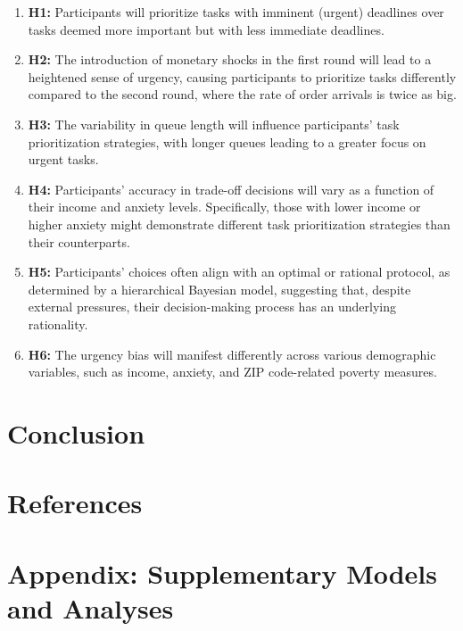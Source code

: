 \documentclass[
]{article}
\providecommand{\tightlist}{%
  \setlength{\itemsep}{0pt}\setlength{\parskip}{0pt}}\usepackage{longtable,booktabs,array}
\begin{document}
\begin{enumerate}
\def\labelenumi{\arabic{enumi}.}
\tightlist
\item
  \textbf{H1:} Participants will prioritize tasks with imminent (urgent)
  deadlines over tasks deemed more important but with less immediate
  deadlines.
\item
  \textbf{H2:} The introduction of monetary shocks in the first round
  will lead to a heightened sense of urgency, causing participants to
  prioritize tasks differently compared to the second round, where the
  rate of order arrivals is twice as big.
\item
  \textbf{H3:} The variability in queue length will influence
  participants' task prioritization strategies, with longer queues
  leading to a greater focus on urgent tasks.
\item
  \textbf{H4:} Participants' accuracy in trade-off decisions will vary
  as a function of their income and anxiety levels. Specifically, those
  with lower income or higher anxiety might demonstrate different task
  prioritization strategies than their counterparts.
\item
  \textbf{H5:} Participants' choices often align with an optimal or
  rational protocol, as determined by a hierarchical Bayesian model,
  suggesting that, despite external pressures, their decision-making
  process has an underlying rationality.
\item
  \textbf{H6:} The urgency bias will manifest differently across various
  demographic variables, such as income, anxiety, and ZIP code-related
  poverty measures.
\end{enumerate}

\hypertarget{conclusion}{%
\section{Conclusion}\label{conclusion}}

\hypertarget{references}{%
\section{References}\label{references}}

\hypertarget{appendix-supplementary-models-and-analyses}{%
\section{Appendix: Supplementary Models and
Analyses}\label{appendix-supplementary-models-and-analyses}}
\end{document}

